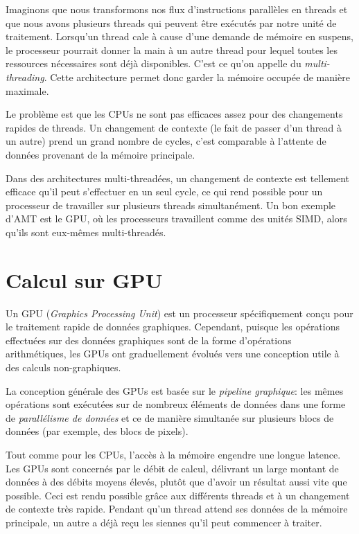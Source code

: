 Imaginons que nous transformons nos flux d'instructions parallèles en threads et que nous avons plusieurs threads qui peuvent être exécutés par notre unité de traitement. Lorsqu'un thread cale à cause d'une demande de mémoire en suspens, le processeur pourrait donner la main à un autre thread pour lequel toutes les ressources nécessaires sont déjà disponibles. C'est ce qu'on appelle du \textit{multi-threading}. Cette architecture permet donc garder la mémoire occupée de manière maximale.

Le problème est que les CPUs ne sont pas efficaces assez pour des changements rapides de threads. Un changement de contexte (le fait de passer d'un thread à un autre) prend un grand nombre de cycles, c'est comparable à l'attente de données provenant de la mémoire principale. 

Dans des architectures multi-threadées, un changement de contexte est tellement efficace qu'il peut s'effectuer en un seul cycle, ce qui rend possible pour un processeur de travailler sur plusieurs threads simultanément. Un bon exemple d'AMT est le GPU, où les processeurs travaillent comme des unités SIMD, alors qu'ils sont eux-mêmes multi-threadés.

\section{Calcul sur GPU}
Un GPU (\textit{Graphics Processing Unit}) est un processeur spécifiquement conçu pour le traitement rapide de données graphiques. Cependant, puisque les opérations effectuées sur des données graphiques sont de la forme d'opérations arithmétiques, les GPUs ont graduellement évolués vers une conception utile à des calculs non-graphiques.

La conception générale des GPUs est basée sur le \textit{pipeline graphique}: les mêmes opérations sont exécutées sur de nombreux éléments de données dans une forme de \textit{parallélisme de données} et ce de manière simultanée sur plusieurs blocs de données (par exemple, des blocs de pixels).

Tout comme pour les CPUs, l'accès à la mémoire engendre une longue latence. Les GPUs sont concernés par le débit de calcul, délivrant un large montant de données à des débits moyens élevés, plutôt que d'avoir un résultat aussi vite que possible. Ceci est rendu possible grâce aux différents threads et à un changement de contexte très rapide. Pendant qu'un thread attend ses données de la mémoire principale, un autre a déjà reçu les siennes qu'il peut commencer à traiter.

